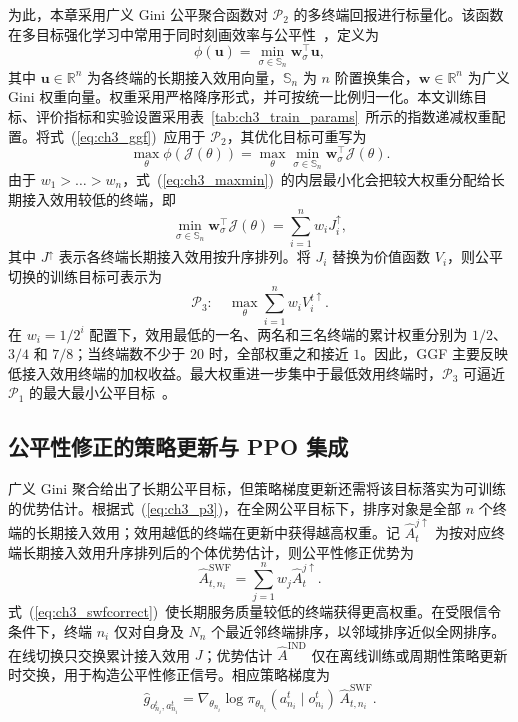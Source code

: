 为此，本章采用广义 Gini 公平聚合函数对 $\mathcal{P}_2$ 的多终端回报进行标量化。该函数在多目标强化学习中常用于同时刻画效率与公平性~\cite{busaFekete-GGI-ICML17,siddique-FairMORL-ICML20}，定义为
\begin{equation}\label{eq:ch3_ggf}
\phi(\mathbf{u})=\min_{\sigma\in\mathbb{S}_n}\mathbf{w}_\sigma^\top\mathbf{u},
\end{equation}
其中 $\mathbf{u}\in\mathbb{R}^n$ 为各终端的长期接入效用向量，$\mathbb{S}_n$ 为 $n$ 阶置换集合，$\mathbf{w}\in\mathbb{R}^n$ 为广义 Gini 权重向量。权重采用严格降序形式，并可按统一比例归一化。本文训练目标、评价指标和实验设置采用表~\ref{tab:ch3_train_params}~所示的指数递减权重配置。将式~(\ref{eq:ch3_ggf})~应用于 $\mathcal{P}_2$，其优化目标可重写为
\begin{equation}\label{eq:ch3_maxmin}
\max_\theta\phi(\mathcal{J}(\theta))=\max_\theta\min_{\sigma\in\mathbb{S}_n}\mathbf{w}_\sigma^\top\mathcal{J}(\theta).
\end{equation}
由于 $w_1>\dots>w_n$，式~(\ref{eq:ch3_maxmin})~的内层最小化会把较大权重分配给长期接入效用较低的终端，即
\begin{equation}\label{eq:ch3_innermin}
\min_{\sigma\in\mathbb{S}_n}\mathbf{w}_\sigma^\top\mathcal{J}(\theta)=\sum_{i=1}^{n}w_iJ_i^{\uparrow},
\end{equation}
其中 $J^{\uparrow}$ 表示各终端长期接入效用按升序排列。将 $J_i$ 替换为价值函数 $V_i$，则公平切换的训练目标可表示为
\begin{equation}\label{eq:ch3_p3}
\mathcal{P}_3:\quad\max_\theta\sum_{i=1}^{n}w_iV_i^{t\uparrow}.
\end{equation}
在 $w_i=1/2^i$ 配置下，效用最低的一名、两名和三名终端的累计权重分别为 $1/2$、$3/4$ 和 $7/8$；当终端数不少于 $20$ 时，全部权重之和接近 $1$。因此，GGF 主要反映低接入效用终端的加权收益。最大权重进一步集中于最低效用终端时，$\mathcal{P}_3$ 可逼近 $\mathcal{P}_1$ 的最大最小公平目标~\cite{siddique-FairMORL-ICML20}。

\subsection{公平性修正的策略更新与 PPO 集成}
\label{subsec:ch3_pg}

广义 Gini 聚合给出了长期公平目标，但策略梯度更新还需将该目标落实为可训练的优势估计。根据式~(\ref{eq:ch3_p3})，在全网公平目标下，排序对象是全部 $n$ 个终端的长期接入效用；效用越低的终端在更新中获得越高权重。记 $\hat{A}_{t}^{j\uparrow}$ 为按对应终端长期接入效用升序排列后的个体优势估计，则公平性修正优势为
\begin{equation}\label{eq:ch3_swfcorrect}
\hat{A}_{t,n_i}^{\mathrm{SWF}}=
\sum_{j=1}^{n}w_j\hat{A}_{t}^{j\uparrow}.
\end{equation}
式~(\ref{eq:ch3_swfcorrect})~使长期服务质量较低的终端获得更高权重。在受限信令条件下，终端 $n_i$ 仅对自身及 $N_n$ 个最近邻终端排序，以邻域排序近似全网排序。在线切换只交换累计接入效用 $J$；优势估计 $\hat{A}^{\mathrm{IND}}$ 仅在离线训练或周期性策略更新时交换，用于构造公平性修正信号。相应策略梯度为
\begin{equation}\label{eq:ch3_swfgrad}
\hat{g}_{o_{n_i}^t,a_{n_i}^t}=
\nabla_{\theta_{n_i}}\log\pi_{\theta_{n_i}}(a_{n_i}^t\mid o_{n_i}^t)\,\hat{A}_{t,n_i}^{\mathrm{SWF}}.
\end{equation}

